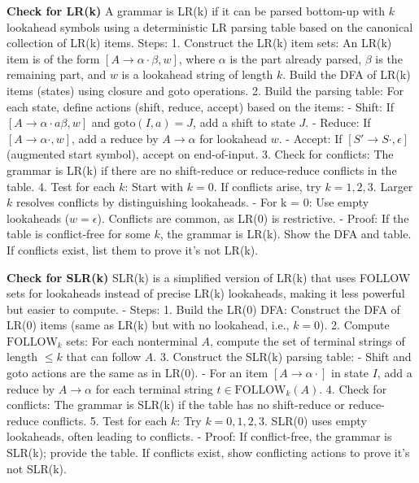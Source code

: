\textbf{Check for LR(k)}
   A grammar is LR(k) if it can be parsed bottom-up with \( k \) lookahead symbols using a deterministic LR parsing table based on the canonical collection of LR(k) items.
   Steps:
     1. Construct the LR(k) item sets: An LR(k) item is of the form \( [A \to \alpha \cdot \beta, w] \), where \( \alpha \) is the part already parsed, \( \beta \) is the remaining part, and \( w \) is a lookahead string of length \( k \). Build the DFA of LR(k) items (states) using closure and goto operations.
     2. Build the parsing table: For each state, define actions (shift, reduce, accept) based on the items:
        - Shift: If \( [A \to \alpha \cdot a \beta, w] \) and \( \text{goto}(I, a) = J \), add a shift to state \( J \).
        - Reduce: If \( [A \to \alpha \cdot, w] \), add a reduce by \( A \to \alpha \) for lookahead \( w \).
        - Accept: If \( [S' \to S \cdot, \epsilon] \) (augmented start symbol), accept on end-of-input.
     3. Check for conflicts: The grammar is LR(k) if there are no shift-reduce or reduce-reduce conflicts in the table.
     4. Test for each \( k \): Start with \( k = 0 \). If conflicts arise, try \( k = 1, 2, 3 \). Larger \( k \) resolves conflicts by distinguishing lookaheads.
     - For k = 0: Use empty lookaheads (\( w = \epsilon \)). Conflicts are common, as LR(0) is restrictive.
   - Proof: If the table is conflict-free for some \( k \), the grammar is LR(k). Show the DFA and table. If conflicts exist, list them to prove it’s not LR(k).

\textbf{Check for SLR(k)}
   SLR(k) is a simplified version of LR(k) that uses FOLLOW sets for lookaheads instead of precise LR(k) lookaheads, making it less powerful but easier to compute.
   - Steps:
     1. Build the LR(0) DFA: Construct the DFA of LR(0) items (same as LR(k) but with no lookahead, i.e., \( k = 0 \)).
     2. Compute $\text{FOLLOW}_k$ sets: For each nonterminal \( A \), compute the set of terminal strings of length \( \leq k \) that can follow \( A \).
     3. Construct the SLR(k) parsing table:
        - Shift and goto actions are the same as in LR(0).
        - For an item \( [A \to \alpha \cdot] \) in state \( I \), add a reduce by \( A \to \alpha \) for each terminal string \( t \in \text{FOLLOW}_k(A) \).
     4. Check for conflicts: The grammar is SLR(k) if the table has no shift-reduce or reduce-reduce conflicts.
     5. Test for each \( k \): Try \( k = 0, 1, 2, 3 \). SLR(0) uses empty lookaheads, often leading to conflicts.
   - Proof: If conflict-free, the grammar is SLR(k); provide the table. If conflicts exist, show conflicting actions to prove it’s not SLR(k).

